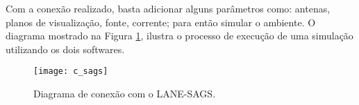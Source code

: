 Com a conexão realizado, basta adicionar alguns parâmetros como: antenas, planos de visualização, fonte, corrente; para então simular o ambiente. O diagrama mostrado na Figura \ref{fg:c_sags}, ilustra o processo de execução de uma simulação utilizando os dois softwares.
\begin{figure}[ht!]
	\centering
	\texttt{[image: c\_sags]}
	\caption{Diagrama de conexão com o LANE-SAGS.}
	\label{fg:c_sags}
\end{figure}
